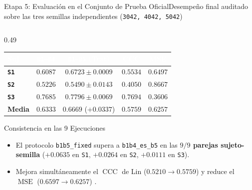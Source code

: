 \begin{frame}{Etapa 5: Evaluaci\'on en el Conjunto de Prueba Oficial}{Desempe\~no final auditado sobre las tres semillas independientes (\texttt{3042, 4042, 5042}) \cite{lin1989concordance,rodas_valencia_tpe_ecog}}
  \begin{columns}[c,onlytextwidth]
    \begin{column}{0.49\textwidth}
      \scriptsize
      \centering
      \renewcommand{\arraystretch}{1.24}
      \setlength{\tabcolsep}{2.8pt}
      \begin{tabular}{@{} l c c c c @{}}
        \toprule
        \rowcolor{ipnDark}
        \textcolor{white}{\textbf{Suj.}} &
        \textcolor{white}{\textbf{\texttt{B1--B4}}} &
        \textcolor{white}{\textbf{\texttt{B1--B5} (Test)}} &
        \textcolor{white}{\textbf{CCC}} &
        \textcolor{white}{\textbf{MSE}} \\
        \midrule
        \textbf{\texttt{S1}} & $0.6087$ & $\mathbf{0.6723 \pm 0.0009}$ & $0.5534$ & $0.6497$ \\
        \rowcolor{rowLight}
        \textbf{\texttt{S2}} & $0.5226$ & $\mathbf{0.5490 \pm 0.0143}$ & $0.4050$ & $0.8667$ \\
        \textbf{\texttt{S3}} & $0.7685$ & $\mathbf{0.7796 \pm 0.0069}$ & $0.7694$ & $0.3606$ \\
        \midrule
        \rowcolor{rowHighlight}
        \textbf{Media} & $\mathbf{0.6333}$ & $\mathbf{0.6669}$ ($\mathbf{+0.0337}$) & $\mathbf{0.5759}$ & $\mathbf{0.6257}$ \\
        \bottomrule
      \end{tabular}

      \vspace{1.2mm}
      \begin{block}{Consistencia en las 9 Ejecuciones}
        \scriptsize
        \begin{itemize}\setlength{\itemsep}{2pt}
          \item El protocolo \texttt{b1b5\_fixed} supera a \texttt{b1b4\_es\_b5} en las \textbf{$9/9$ parejas sujeto-semilla} ($+0.0635$ en \texttt{S1}, $+0.0264$ en \texttt{S2}, $+0.0111$ en \texttt{S3}).
          \item Mejora simult\'aneamente el $\operatorname{CCC}$ de Lin ($0.5210 \to \mathbf{0.5759}$) y reduce el $\operatorname{MSE}$ ($0.6597 \to \mathbf{0.6257}$) \cite{lin1989concordance}.
        \end{itemize}
      \end{block}
    \end{column}


\end{columns}
\end{frame}
